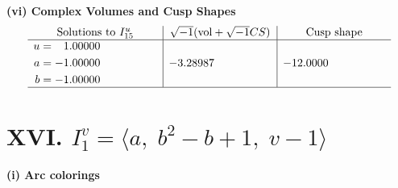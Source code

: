 \documentclass[1p]{elsarticle_modified}
\theoremstyle{definition}
\newcommand{\I}{\sqrt{-1}}
\begin{document}
\newpage\flushleft \textbf{(vi) Complex Volumes and Cusp Shapes}
$$\begin{array}{c|c|c}  
\text{Solutions to }I^u_{15}& \I (\text{vol} + \sqrt{-1}CS) & \text{Cusp shape}\\
 \hline 
\begin{aligned}
u &= \phantom{-}1.00000\phantom{ +0.000000I} \\
a &= -1.00000\phantom{ +0.000000I} \\
b &= -1.00000\phantom{ +0.000000I}\end{aligned}
 & -3.28987\phantom{ +0.000000I} & -12.0000\phantom{ +0.000000I}\\
 \hline 
 \end{array}$$\newpage\newpage\renewcommand{\arraystretch}{1}
\centering \section*{XVI. $I^v_{1}= \langle a,\;b^2- b+1,\;v-1 \rangle$}
\flushleft \textbf{(i) Arc colorings}\\
\end{document}

